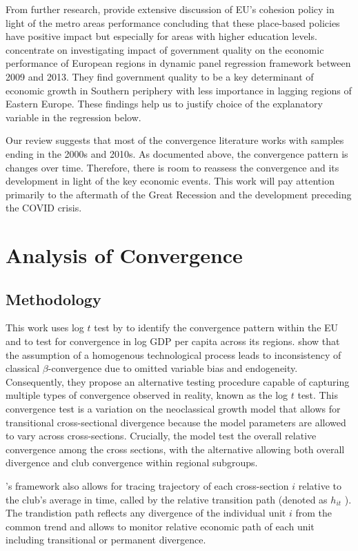 \documentclass[11pt]{article}
\begin{document}
From further research, \citet{ehrlich2020place} provide extensive discussion of EU’s cohesion policy in light of the metro areas performance concluding that these place-based policies have positive impact but especially for areas with higher education levels. \citet{rodriguez2020institutional} concentrate on investigating impact of government quality on the economic performance of European regions in dynamic panel regression framework between 2009 and 2013. They find government quality to be a key determinant of economic growth in Southern periphery with less importance in lagging regions of Eastern Europe. These findings help us to justify choice of the explanatory variable in the regression below.

Our review suggests that most of the convergence literature works with samples ending in the 2000s and 2010s. As documented above, the convergence pattern is changes over time. Therefore, there is room to reassess the convergence and its development in light of the key economic events. This work will pay attention primarily to the aftermath of the Great Recession and the development preceding the COVID crisis.

\section{Analysis of Convergence}
\subsection{Methodology}

This work uses log $t$ test by \citet{phillips2007transition}  to identify the convergence pattern within the EU and to test for convergence in log GDP per capita across its regions. \citet{phillips2007transition} show that the assumption of a homogenous technological process  leads to inconsistency of classical $\beta$-convergence due to omitted variable bias and endogeneity. Consequently, they propose an alternative testing procedure capable of capturing multiple types of convergence observed in reality, known as the log $t$ test. This convergence test is a variation on the neoclassical growth model that allows for transitional cross-sectional divergence  because the model parameters are allowed to vary across cross-sections.  Crucially, the model test the overall relative convergence among the cross sections, with the alternative allowing both overall divergence and club convergence within regional subgroups. 

\citeauthor{phillips2009economic}'s framework also allows for tracing  trajectory of each cross-section $i$ relative to the club's average in time, called by \citet{phillips2009economic} the relative transition path (denoted as $h_{it}$ ). The trandistion path reflects any divergence of the individual unit $i$ from the common trend and allows to monitor relative economic path of each unit including transitional or permanent divergence.
\end{document}

